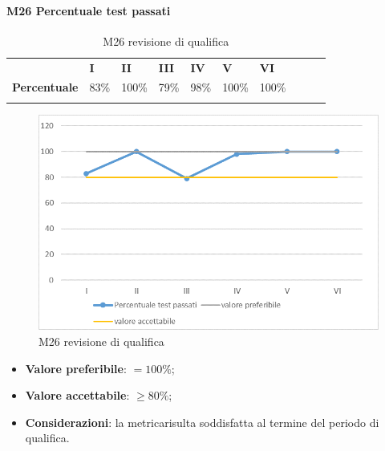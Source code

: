\paragraph{M26 Percentuale test passati} \mbox{}
\begin{longtable}[H!] {						
		>{}p{50mm}  		
		>{}p{8mm}
		>{}p{8mm}		
		>{}p{8mm}		
		>{}p{8mm}		
		>{}p{8mm}		
		>{}p{8mm}
		>{}p{8mm}
		>{}p{8mm}
		>{}p{8mm}
	}
	\rowcolor{gray!50}
	\textbf{} & \textbf{I} & \textbf{II} & \textbf{III} & \textbf{IV} & \textbf{V} & \textbf{VI} \TBstrut \\ [2mm]
	\textbf{Percentuale} & 83\% & 100\% & 79\% & 98\% & 100\% & 100\% \TBstrut \\ [2mm]
	\rowcolor{white}
	\caption{M26 revisione di qualifica}
\end{longtable}
\begin{figure}[H] 	
	\includegraphics[width=\linewidth]{./img/grafici/RQ26.png}	
	\caption{M26 revisione di qualifica}	
\end{figure}
\begin{itemize}
	\item \textbf{Valore preferibile}: $= 100\%$;
	\item \textbf{Valore accettabile}: $\ge 80\%$;
	\item \textbf{Considerazioni}: la metrica\glosp risulta soddisfatta al termine del periodo di qualifica.
\end{itemize}

